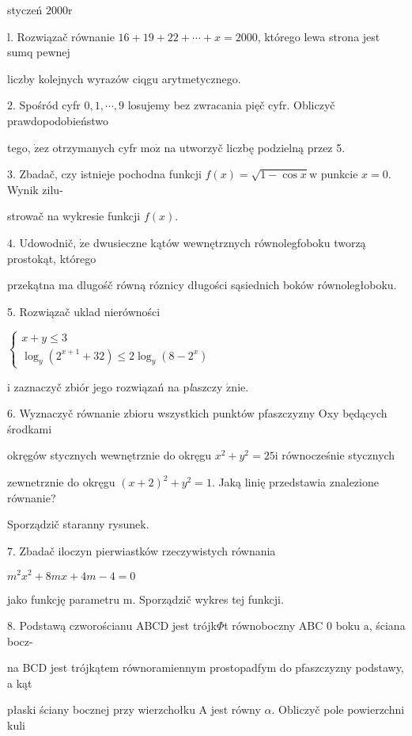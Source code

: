 \documentclass[a4paper,12pt]{article}
\begin{document}
styczeń $2000\mathrm{r}$

l. Rozwiązač równanie $16+19+22+\cdots+x=2000$, którego lewa strona jest sumq pewnej

liczby kolejnych wyrazów ciqgu arytmetycznego.

2. Spośród cyfr $0,1,\cdots,9$ losujemy bez zwracania pięč cyfr. Obliczyč prawdopodobieństwo

tego, $\dot{\mathrm{z}}\mathrm{e}\mathrm{z}$ otrzymanych cyfr $\mathrm{m}\mathrm{o}\dot{\mathrm{z}}$ na utworzyč liczbę podzielną przez 5.

3. Zbadač, czy istnieje pochodna funkcji $f(x)=\sqrt{1-\cos x}\mathrm{w}$ punkcie $x=0$. Wynik zilu-

strowač na wykresie funkcji $f(x).$

4. Udowodnič, $\dot{\mathrm{z}}\mathrm{e}$ dwusieczne kątów wewnętrznych równolegfoboku tworzą prostokąt, którego

przekątna ma dlugośč równą róznicy długości sąsiednich boków równoległoboku.

5. Rozwiązač uklad nierówności

$\left\{\begin{array}{l}
x+y\leq 3\\
\log_{y}(2^{x+1}+32)\leq 2\log_{y}(8-2^{x})
\end{array}\right.$

$\mathrm{i}$ zaznaczyč zbiór jego rozwiązań na p{\it l}aszczy $\acute{\mathrm{z}}\mathrm{n}\mathrm{i}\mathrm{e}.$

6. Wyznaczyč równanie zbioru wszystkich punktów pfaszczyzny Oxy będących środkami

okręgów stycznych wewnętrznie do okręgu $x^{2} +y^{2} = 25 \mathrm{i}$ równocześnie stycznych

zewnetrznie do okręgu $(x+2)^{2}+y^{2}= 1$. Jaką linię przedstawia znalezione równanie?

Sporządzič staranny rysunek.

7. Zbadač iloczyn pierwiastków rzeczywistych równania

$m^{2}x^{2}+8mx+4m-4=0$

jako funkcję parametru $\mathrm{m}$. Sporządzič wykres tej funkcji.

8. Podstawą czworościanu ABCD jest trójk$\Phi$t równoboczny ABC $0$ boku $\mathrm{a}$, ściana bocz-

na BCD jest trójkątem równoramiennym prostopadfym do pfaszczyzny podstawy, a kąt

płaski ściany bocznej przy wierzchołku A jest równy $\alpha$. Obliczyč pole powierzchni kuli
\end{document}
